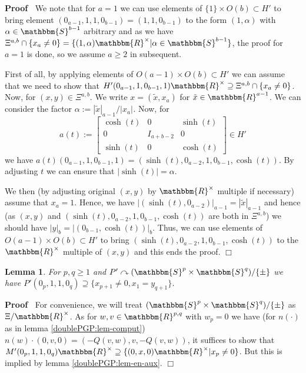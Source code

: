 \documentclass{article}
\newcommand{\assign}{:=}
\newenvironment{proof}{\noindent\textbf{Proof\ }}{\hspace*{\fill}$\Box$\medskip}
\numberwithin{definition}{section}
\newtheorem{lemma}{Lemma}
\numberwithin{lemma}{section}
\numberwithin{proposition}{section}
{\theorembodyfont{\rmfamily}\newtheorem{remark}{Remark}
\numberwithin{remark}{section}
}
\begin{document}
\begin{proof}
  We note that for $a = 1$ we can use elements of $\{ 1 \} \times O ( b)
  \subset H'$ to bring element $( 0_{a - 1}, 1, 1, 0_{b - 1}) = ( 1, 1, 0_{b -
  1})$ to the form $( 1, \alpha)$ with $\alpha \in \mathbbm{S}^{b - 1}$
  arbitrary and as we have $\Xi^{a, b} \cap \{ x_a \neq 0 \} = \{ ( 1, \alpha)
  \mathbbm{R}^{\times} | \alpha \in \mathbbm{S}^{b - 1} \}$, the proof for $a
  = 1$ is done, so we assume $a \geqslant 2$ in subsequent.
  
  First of all, by applying elements of $O ( a - 1) \times O ( b) \subset H'$
  we can assume that we need to show that $H' ( 0_{a - 1}, 1, 0_{b - 1}, 1)
  \mathbbm{R}^{\times} \supseteq \Xi^{a, b} \cap \{ x_a \neq 0 \}$. Now, for
  $( x, y) \in \Xi^{a, b}$. We write $x = ( \tilde{x}, x_a)$ for $\tilde{x}
  \in \mathbbm{R}^{a - 1}$. We can consider the factor $\alpha \assign |
  \tilde{x} |_{a - 1} / | x_a |_{}$. Now, for
  \[ a ( t) \assign \left[ \begin{array}{lll}
       \cosh ( t) & 0 & \sinh ( t)\\
       0 & I_{a + b - 2} & 0\\
       \sinh ( t) & 0 & \cosh ( t)
     \end{array} \right] \in H' \]
  we have $a ( t) ( 0_{a - 1}, 1, 0_{b - 1}, 1) = ( \sinh ( t), 0_{a - 2}, 1,
  0_{b - 1}, \cosh ( t))$. By adjusting $t$ we can ensure that $| \sinh ( t) |
  = \alpha$.
  
  We then (by adjusting original $( x, y)$ by $\mathbbm{R}^{\times}$ multiple
  if necessary) assume that $x_a = 1$. Hence, we have $| ( \sinh ( t), 0_{a -
  2}) |_{a - 1} = | \tilde{x} |_{a - 1}$ and hence (as $( x, y)$ and $( \sinh
  ( t), 0_{a - 2}, 1, 0_{b - 1}, \cosh ( t))$ are both in $\Xi^{a, b}$) we
  should have $| y |_b = | ( 0_{b - 1}, \cosh ( t)) |_b$. Thus, we can use
  elements of $O ( a - 1) \times O ( b) \subset H'$ to bring $( \sinh ( t),
  0_{a - 2}, 1, 0_{b - 1}, \cosh ( t))$ to the $\mathbbm{R}^{\times}$ multiple
  of $( x, y)$ and this ends the proof.
\end{proof}

\begin{lemma}
  \label{doublePGP:lem-en}For $p, q \geqslant 1$ and $P' \curvearrowright (
  \mathbbm{S}^p \times \mathbbm{S}^q) / \{ \pm \}$ we have $P' ( 0_p, 1, 1,
  0_q) \supseteq \{ x_{p + 1} \neq 0, x_1 = y_{q + 1} \}$.
\end{lemma}

\begin{proof}
  For convenience, we will treat $( \mathbbm{S}^p \times \mathbbm{S}^q) / \{
  \pm \}$ as $\Xi /\mathbbm{R}^{\times}$. As for $w, v \in \mathbbm{R}^{p, q}$
  with $w_p = 0$ we have (for $n ( \cdot)$ as in lemma
  \ref{doublePGP:lem-comput}) $n ( w) \cdot ( 0, v, 0) = ( - Q ( v, w), v, - Q
  ( v, w))$, it suffices to show that $M' ( 0_p, 1, 1, 0_q)
  \mathbbm{R}^{\times} \supseteq \{ ( 0, x, 0) \mathbbm{R}^{\times} | x_p \neq
  0 \}$. But this is implied by lemma \ref{doublePGP:lem-en-aux}.
\end{proof}
\end{document}
